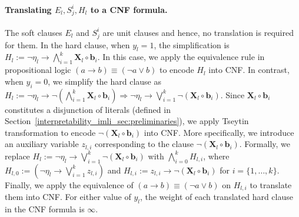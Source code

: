 \paragraph{Translating $ E_l, S^i_j, H_l $ to a CNF formula.} 
The soft clauses $ E_l $ and $ S_j^i $ are unit clauses and hence, no translation is required for them.  In the hard clause, when $ y_l=1 $, the simplification is $ H_l:= \neg \eta_l \rightarrow \bigwedge_{i=1}^k {\mathbf{X}_l} \circ {\mathbf{b}_{i}}  $. In this case, we apply the equivalence rule in propositional logic $ (a \rightarrow b) \equiv (\neg a \vee b) $  to encode $ H_l $ into  CNF. In contrast, when $ y_i=0 $, we simplify the hard clause as $ H_l:= \neg \eta_l \rightarrow \neg (\bigwedge_{i=1}^k {\mathbf{X}_l} \circ {\mathbf{b}_{i}}) \Rightarrow  \neg \eta_l \rightarrow \bigvee_{i=1}^k \neg({\mathbf{X}_l} \circ {\mathbf{b}_{i}})$. Since $ \mathbf{X}_l \circ \mathbf{b}_{i} $ constitutes a disjunction of literals (defined in Section~\ref{interpretability_imli_sec:preliminaries}), we apply Tseytin transformation to encode  $ \neg (\mathbf{X}_l \circ \mathbf{b}_{i}) $ into CNF. More specifically, we introduce an auxiliary variable $ z_{l,i} $ corresponding to the clause $ \neg ({\mathbf{X}_l} \circ {\mathbf{b}_{i}}) $. Formally, we replace $ H_l := \neg \eta_l \rightarrow  \bigvee_{i=1}^k \neg ({\mathbf{X}_l} \circ {\mathbf{b}_{i}}) $ with   $ \bigwedge_{i=0}^k H_{l,i} $,  where $ H_{l,0}:= (\neg \eta_l \rightarrow  \bigvee_{i=1}^k  z_{l,i}) $  and  $  H_{l,i}:= z_{l,i} \rightarrow  \neg({\mathbf{X}_l} \circ {\mathbf{b}_{i}})  $ for $ i=\{1,\dots,k\} $. Finally, we  apply the equivalence of $ (a \rightarrow b) \equiv (\neg a \vee b) $ on $ H_{l,i} $ to translate them into CNF. For either value of $ y_l $, the weight of each translated hard clause in the CNF formula is $ \infty $.








